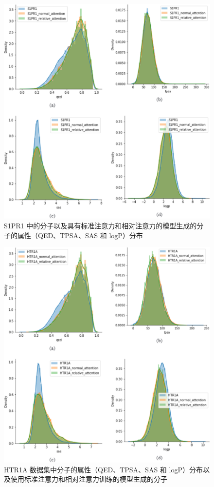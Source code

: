 \begin{figure}[H]
  \centering
  \includegraphics[width=\linewidth]{figures/5.png}
  \caption{S1PR1 中的分子以及具有标准注意力和相对注意力的模型生成的分子的属性（QED、TPSA、SAS 和 logP）分布}
  \label{fig:5}
\end{figure}

\begin{figure}[H]
  \centering
  \includegraphics[width=\linewidth]{figures/6.png}
  \caption{HTR1A 数据集中分子的属性（QED、TPSA、SAS 和 logP）分布以及使用标准注意力和相对注意力训练的模型生成的分子}
  \label{fig:6}
\end{figure}

